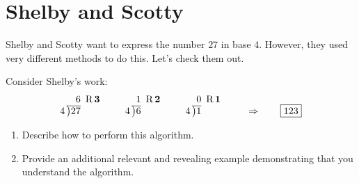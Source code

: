 \newpage
\section{Shelby and Scotty}\label{A:SS}

Shelby and Scotty want to express the number $27$ in base
$4$. However, they used very different methods to do this. Let's check
them out.


\begin{prob} Consider Shelby's work:
\[
4\,\begin{tabular}[b]{@{}r@{} r}
$6$ &\, R\,$\boldsymbol{3}$\\ \cline{1-1}
\big)\begin{tabular}[t]{@{}l@{}}
$27$ 
\end{tabular}
\end{tabular}
\qquad
4\,\begin{tabular}[b]{@{}r@{} r}
$1$ &\, R\,$\boldsymbol{2}$\\ \cline{1-1}
\big)\begin{tabular}[t]{@{}l@{}}
$6$ 
\end{tabular}
\end{tabular}
\qquad
4\,\begin{tabular}[b]{@{}r@{} r}
$0$ &\, R\,$\boldsymbol{1}$\\ \cline{1-1}
\big)\begin{tabular}[t]{@{}l@{}}
$1$ 
\end{tabular}
\end{tabular} \qquad \Rightarrow \qquad \fbox{$123$}
\]
\begin{enumerate}
\item Describe how to perform this algorithm.
\item Provide an additional relevant and revealing example
  demonstrating that you understand the algorithm.
\end{enumerate}
\end{prob}




